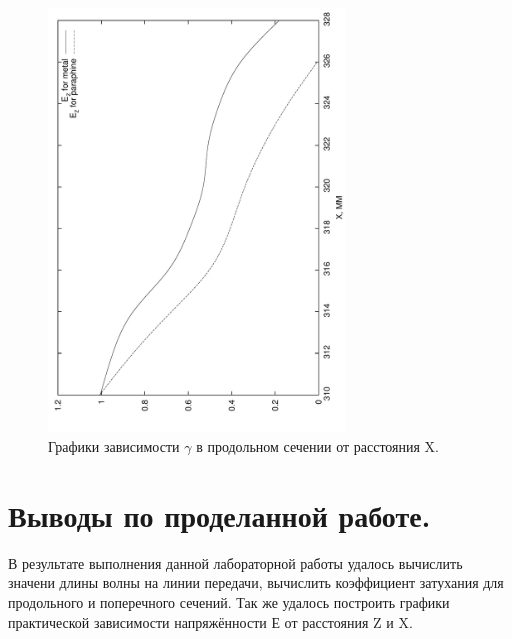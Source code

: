 \documentclass[a4paper, titlepage, 10pt]{article}
\begin{document}
\begin{figure}[h!]
 \centering
 \includegraphics[angle = 270,width=0.7\textwidth]{Ex}
 \caption{Графики зависимости \( \gamma \) в продольном сечении от расстояния X.}
\end{figure}

\appendix
\section*{Выводы по проделанной работе.}
В результате выполнения данной лабораторной работы удалось вычислить значени длины волны на линии передачи, вычислить коэффициент затухания для продольного и поперечного сечений. Так же удалось построить графики практической зависимости напряжённости Е от расстояния Z и X.
\end{document}
